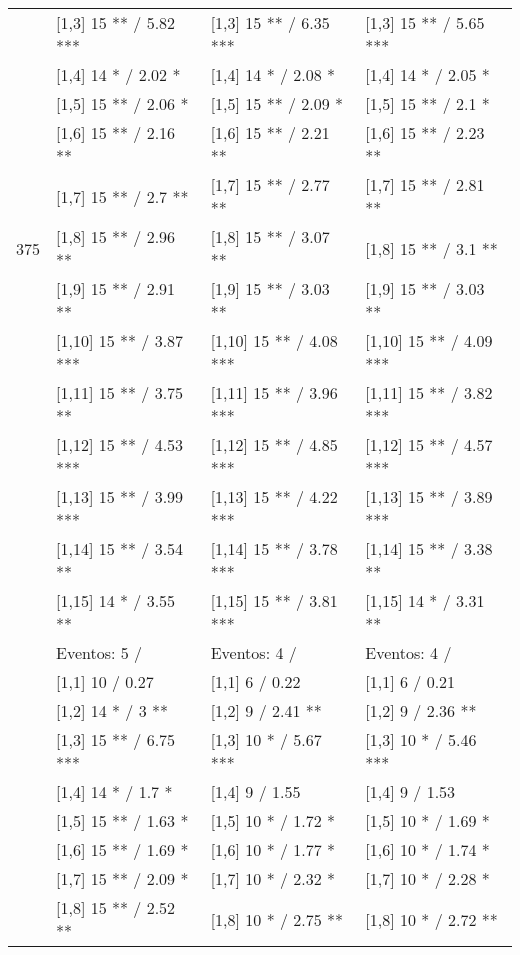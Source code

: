 \begin{table}
\begin{tabular}[t]{llll}
 & {}[1,3] 15 ** / 5.82 *** & {}[1,3] 15 ** / 6.35 *** & {}[1,3] 15 ** / 5.65 ***\\
\addlinespace
 & {}[1,4] 14 * / 2.02 * & {}[1,4] 14 * / 2.08 * & {}[1,4] 14 * / 2.05 *\\
 & {}[1,5] 15 ** / 2.06 * & {}[1,5] 15 ** / 2.09 * & {}[1,5] 15 ** / 2.1 *\\
 & {}[1,6] 15 ** / 2.16 ** & {}[1,6] 15 ** / 2.21 ** & {}[1,6] 15 ** / 2.23 **\\
 & {}[1,7] 15 ** / 2.7 ** & {}[1,7] 15 ** / 2.77 ** & {}[1,7] 15 ** / 2.81 **\\
375 & {}[1,8] 15 ** / 2.96 ** & {}[1,8] 15 ** / 3.07 ** & {}[1,8] 15 ** / 3.1 **\\
\addlinespace
 & {}[1,9] 15 ** / 2.91 ** & {}[1,9] 15 ** / 3.03 ** & {}[1,9] 15 ** / 3.03 **\\
 & {}[1,10] 15 ** / 3.87 *** & {}[1,10] 15 ** / 4.08 *** & {}[1,10] 15 ** / 4.09 ***\\
 & {}[1,11] 15 ** / 3.75 ** & {}[1,11] 15 ** / 3.96 *** & {}[1,11] 15 ** / 3.82 ***\\
 & {}[1,12] 15 ** / 4.53 *** & {}[1,12] 15 ** / 4.85 *** & {}[1,12] 15 ** / 4.57 ***\\
 & {}[1,13] 15 ** / 3.99 *** & {}[1,13] 15 ** / 4.22 *** & {}[1,13] 15 ** / 3.89 ***\\
\addlinespace
 & {}[1,14] 15 ** / 3.54 ** & {}[1,14] 15 ** / 3.78 *** & {}[1,14] 15 ** / 3.38 **\\
 & {}[1,15] 14 * / 3.55 ** & {}[1,15] 15 ** / 3.81 *** & {}[1,15] 14 * / 3.31 **\\
 & Eventos:  5 / & Eventos:  4 / & Eventos:  4 /\\
 & {}[1,1] 10  / 0.27 & {}[1,1] 6  / 0.22 & {}[1,1] 6  / 0.21\\
 & {}[1,2] 14 * / 3 ** & {}[1,2] 9  / 2.41 ** & {}[1,2] 9  / 2.36 **\\
\addlinespace
 & {}[1,3] 15 ** / 6.75 *** & {}[1,3] 10 * / 5.67 *** & {}[1,3] 10 * / 5.46 ***\\
 & {}[1,4] 14 * / 1.7 * & {}[1,4] 9  / 1.55 & {}[1,4] 9  / 1.53\\
 & {}[1,5] 15 ** / 1.63 * & {}[1,5] 10 * / 1.72 * & {}[1,5] 10 * / 1.69 *\\
 & {}[1,6] 15 ** / 1.69 * & {}[1,6] 10 * / 1.77 * & {}[1,6] 10 * / 1.74 *\\
 & {}[1,7] 15 ** / 2.09 * & {}[1,7] 10 * / 2.32 * & {}[1,7] 10 * / 2.28 *\\
\addlinespace
500 & {}[1,8] 15 ** / 2.52 ** & {}[1,8] 10 * / 2.75 ** & {}[1,8] 10 * / 2.72 **\\

\end{tabular}
\end{table}
